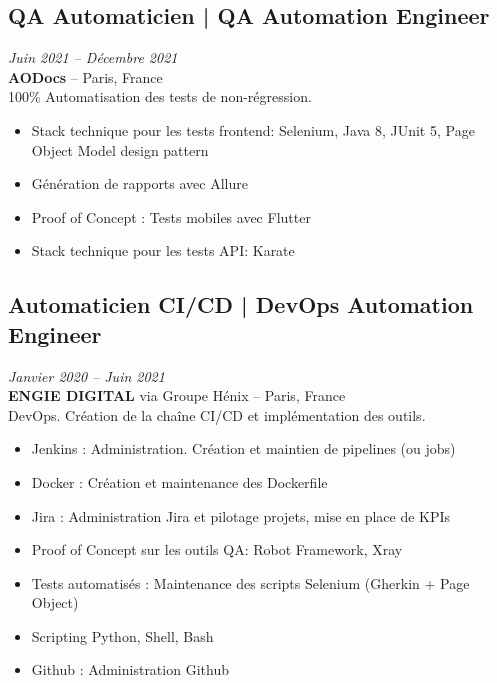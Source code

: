 \documentclass[11pt,a4paper]{article}
\begin{document}
\subsection*{QA Automaticien | QA Automation Engineer} \hfill \textit{Juin 2021 -- Décembre 2021}\\
\textbf{AODocs} -- Paris, France\\
100\% Automatisation des tests de non-régression.
\begin{itemize}
    \item Stack technique pour les tests frontend: Selenium, Java 8, JUnit 5, Page Object Model design pattern
    \item Génération de rapports avec Allure
    \item Proof of Concept : Tests mobiles avec Flutter
    \item Stack technique pour les tests API: Karate
\end{itemize}

\subsection*{Automaticien CI/CD | DevOps Automation Engineer} \hfill \textit{Janvier 2020 -- Juin 2021}\\
\textbf{ENGIE DIGITAL} via Groupe Hénix -- Paris, France\\
DevOps. Création de la chaîne CI/CD et implémentation des outils.
\begin{itemize}
    \item Jenkins : Administration. Création et maintien de pipelines (ou jobs)
    \item Docker : Création et maintenance des Dockerfile
    \item Jira : Administration Jira et pilotage projets, mise en place de KPIs
    \item Proof of Concept sur les outils QA: Robot Framework, Xray
    \item Tests automatisés : Maintenance des scripts Selenium (Gherkin + Page Object)
    \item Scripting Python, Shell, Bash
    \item Github : Administration Github
\end{itemize}
\end{document}
